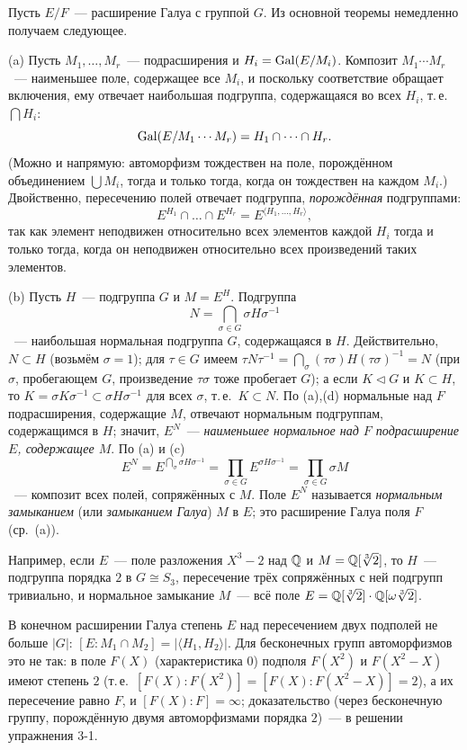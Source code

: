 \begin{remark}[3.18]
Пусть $E/F$~--- расширение Галуа с группой $G$. Из основной теоремы немедленно получаем следующее.

(a) Пусть $M_1,\dots,M_r$~--- подрасширения и $H_i=\operatorname{Gal}(E/M_i)$. Композит $M_1\cdots M_r$~--- наименьшее поле, содержащее
все $M_i$, и поскольку соответствие обращает включения, ему отвечает наибольшая подгруппа, содержащаяся во всех $H_i$, т.\,е.\
$\bigcap H_i$:
\[
\operatorname{Gal}(E/M_1\cdots M_r)=H_1\cap\dots\cap H_r .
\]
(Можно и напрямую: автоморфизм тождествен на поле, порождённом объединением $\bigcup M_i$, тогда и только тогда, когда он
тождествен на каждом $M_i$.) Двойственно, пересечению полей отвечает подгруппа, \emph{порождённая} подгруппами:
\[
E^{H_1}\cap\dots\cap E^{H_r}=E^{\langle H_1,\dots,H_r\rangle},
\]
так как элемент неподвижен относительно всех элементов каждой $H_i$ тогда и только тогда, когда он неподвижен
относительно всех произведений таких элементов.

(b) Пусть $H$~--- подгруппа $G$ и $M=E^H$. Подгруппа
\[
N=\bigcap_{\sigma\in G}\sigma H\sigma^{-1}
\]
~--- наибольшая нормальная подгруппа $G$, содержащаяся в $H$. Действительно, $N\subset H$ (возьмём $\sigma=1$); для
$\tau\in G$ имеем $\tau N\tau^{-1}=\bigcap_\sigma(\tau\sigma)H(\tau\sigma)^{-1}=N$ (при $\sigma$, пробегающем $G$, произведение
$\tau\sigma$ тоже пробегает $G$); а если $K\triangleleft G$ и $K\subset H$, то $K=\sigma K\sigma^{-1}\subset\sigma H\sigma^{-1}$ для
всех $\sigma$, т.\,е.\ $K\subset N$. По \rf{3.17}(a),(d) нормальные над $F$ подрасширения, содержащие $M$, отвечают
нормальным подгруппам, содержащимся в $H$; значит, $E^N$~--- \emph{наименьшее нормальное над $F$ подрасширение $E$,
содержащее $M$}. По (a) и \rf{3.17}(c)
\[
E^N=E^{\bigcap_\sigma\sigma H\sigma^{-1}}=\prod_{\sigma\in G}E^{\sigma H\sigma^{-1}}=\prod_{\sigma\in G}\sigma M
\]
~--- композит всех полей, сопряжённых с $M$. Поле $E^N$ называется \emph{нормальным замыканием} (или \emph{замыканием
Галуа}) $M$ в $E$; это расширение Галуа поля $F$ (ср.\ \rf{3.12a}(a)).
\end{remark}

Например, если $E$~--- поле разложения $X^3-2$ над $\mathbb Q$ и $M=\mathbb Q[\sqrt[3]2]$, то $H$~--- подгруппа порядка $2$ в $G\cong S_3$,
пересечение трёх сопряжённых с ней подгрупп тривиально, и нормальное замыкание $M$~--- всё поле $E=\mathbb Q[\sqrt[3]2]\cdot\mathbb Q[\omega\sqrt[3]2]$.

\begin{aside}[3.18a]
В конечном расширении Галуа степень $E$ над пересечением двух подполей не больше $|G|$: $[E:M_1\cap M_2]=|\langle H_1,H_2\rangle|$.
Для бесконечных групп автоморфизмов это не так: в поле $F(X)$ (характеристика $0$) подполя $F(X^2)$ и $F(X^2-X)$ имеют
степень $2$ (т.\,е.\ $[F(X):F(X^2)]=[F(X):F(X^2-X)]=2$), а их пересечение равно $F$, и $[F(X):F]=\infty$; доказательство (через бесконечную группу,
порождённую двумя автоморфизмами порядка $2$)~--- в решении упражнения 3-1.
\end{aside}

